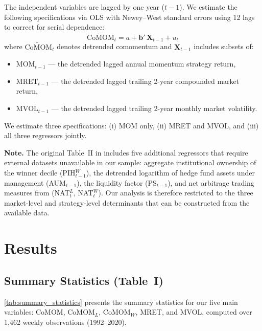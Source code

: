 \documentclass[10pt]{article}
\begin{document}
The independent variables are lagged by one year ($t-1$). We estimate the following specifications via OLS with Newey--West \citep{NeweyWest1987} standard errors using 12 lags to correct for serial dependence:
\begin{equation}
    \widetilde{\text{CoMOM}}_t = a + \mathbf{b}' \, \mathbf{X}_{t-1} + u_t
\end{equation}
where $\widetilde{\text{CoMOM}}_t$ denotes detrended comomentum and $\mathbf{X}_{t-1}$ includes subsets of:
\begin{itemize}[nosep]
    \item $\text{MOM}_{t-1}$ --- the detrended lagged annual momentum strategy return,
    \item $\text{MRET}_{t-1}$ --- the detrended lagged trailing 2-year compounded market return,
    \item $\text{MVOL}_{t-1}$ --- the detrended lagged trailing 2-year monthly market volatility.
\end{itemize}
We estimate three specifications: (i) MOM only, (ii) MRET and MVOL, and (iii) all three regressors jointly.

\medskip
\noindent\textbf{Note.} The original Table~II in \citet{LouPolk2021} includes five additional regressors that require external datasets unavailable in our sample: aggregate institutional ownership of the winner decile (PIH$^W_{t-1}$), the detrended logarithm of hedge fund assets under management (AUM$_{t-1}$), the \citet{PastorStambaugh2003} liquidity factor (PS$_{t-1}$), and net arbitrage trading measures from \citet{ChenDaHuang2019} (NAT$^L_t$, NAT$^W_t$). Our analysis is therefore restricted to the three market-level and strategy-level determinants that can be constructed from the available data.


\section{Results}

\subsection{Summary Statistics (Table~I)}

\autoref{tab:summary_statistics} presents the summary statistics for our five main variables: CoMOM, CoMOM$_L$, CoMOM$_W$, MRET, and MVOL, computed over 1{,}462 weekly observations (1992--2020).
\end{document}
